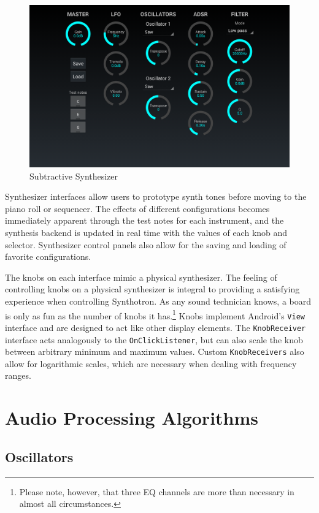 \documentclass[letterpaper,12pt]{article}
\begin{document}
\begin{figure}[h]
\centering
\includegraphics[width=\textwidth]{figures/subtractivesynth.png}
\caption{Subtractive Synthesizer}
\label{fig:subtractivesynth}
\end{figure}

Synthesizer interfaces allow users to prototype synth tones before moving to the piano roll or sequencer. The effects of different configurations becomes immediately apparent through the test notes for each instrument, and the synthesis backend is updated in real time with the values of each knob and selector. Synthesizer control panels also allow for the saving and loading of favorite configurations.


The knobs on each interface mimic a physical synthesizer. The feeling of controlling knobs on a physical synthesizer is integral to providing a satisfying experience when controlling Synthotron. As any sound technician knows, a board is only as fun as the number of knobs it has.\footnote{Please note, however, that three EQ channels are more than necessary in almost all circumstances.} Knobs implement Android's \texttt{View} interface and are designed to act like other display elements. The \texttt{KnobReceiver} interface acts analogously to the \texttt{OnClickListener}, but can also scale the knob between arbitrary minimum and maximum values. Custom \texttt{KnobReceivers} also allow for logarithmic scales, which are necessary when dealing with frequency ranges.
\section{Audio Processing Algorithms}

\subsection{Oscillators}
\end{document}
